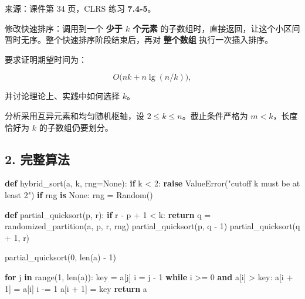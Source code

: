 \documentclass[
  UTF8,fontset=none,zihao=5]{ctexart}
\newenvironment{Shaded}{}{}
\newcommand{\BuiltInTok}[1]{#1}
\newcommand{\ControlFlowTok}[1]{\textcolor[rgb]{0.00,0.44,0.13}{\textbf{#1}}}
\newcommand{\DecValTok}[1]{\textcolor[rgb]{0.25,0.63,0.44}{#1}}
\newcommand{\KeywordTok}[1]{\textcolor[rgb]{0.00,0.44,0.13}{\textbf{#1}}}
\newcommand{\NormalTok}[1]{#1}
\newcommand{\OperatorTok}[1]{\textcolor[rgb]{0.40,0.40,0.40}{#1}}
\newcommand{\PreprocessorTok}[1]{\textcolor[rgb]{0.74,0.48,0.00}{#1}}
\newcommand{\StringTok}[1]{\textcolor[rgb]{0.25,0.44,0.63}{#1}}
\newcommand{\VariableTok}[1]{\textcolor[rgb]{0.10,0.09,0.49}{#1}}
\renewenvironment{Shaded}{\begin{snugshade}}{\end{snugshade}}
\let\OldSubsection\subsection
\renewcommand{\subsection}{\Needspace{4\baselineskip}\OldSubsection}
\begin{document}
来源：课件第 34 页，CLRS 练习 \textbf{7.4-5}。

修改快速排序：调用到一个 \textbf{少于 \(k\) 个元素}
的子数组时，直接返回，让这个小区间暂时无序。整个快速排序阶段结束后，再对
\textbf{整个数组} 执行一次插入排序。

要求证明期望时间为：

\[
\boxed{O\bigl(nk+n\lg(n/k)\bigr)},
\]

并讨论理论上、实践中如何选择 \(k\)。

分析采用互异元素和均匀随机枢轴，设 \(2\le k\le n\)。截止条件严格为
\(m<k\)，长度恰好为 \(k\) 的子数组仍要划分。

\hypertarget{ux5b8cux6574ux7b97ux6cd5}{%
\subsection{2. 完整算法}\label{ux5b8cux6574ux7b97ux6cd5}}

\Needspace{246pt}

\begin{Shaded}
\begin{Highlighting}[]
\KeywordTok{def}\NormalTok{ hybrid\_sort(a, k, rng}\OperatorTok{=}\VariableTok{None}\NormalTok{):}
    \ControlFlowTok{if}\NormalTok{ k }\OperatorTok{\textless{}} \DecValTok{2}\NormalTok{:}
        \ControlFlowTok{raise} \PreprocessorTok{ValueError}\NormalTok{(}\StringTok{"cutoff k must be at least 2"}\NormalTok{)}
    \ControlFlowTok{if}\NormalTok{ rng }\KeywordTok{is} \VariableTok{None}\NormalTok{:}
\NormalTok{        rng }\OperatorTok{=}\NormalTok{ Random()}

    \KeywordTok{def}\NormalTok{ partial\_quicksort(p, r):}
        \ControlFlowTok{if}\NormalTok{ r }\OperatorTok{{-}}\NormalTok{ p }\OperatorTok{+} \DecValTok{1} \OperatorTok{\textless{}}\NormalTok{ k:}
            \ControlFlowTok{return}
\NormalTok{        q }\OperatorTok{=}\NormalTok{ randomized\_partition(a, p, r, rng)}
\NormalTok{        partial\_quicksort(p, q }\OperatorTok{{-}} \DecValTok{1}\NormalTok{)}
\NormalTok{        partial\_quicksort(q }\OperatorTok{+} \DecValTok{1}\NormalTok{, r)}

\NormalTok{    partial\_quicksort(}\DecValTok{0}\NormalTok{, }\BuiltInTok{len}\NormalTok{(a) }\OperatorTok{{-}} \DecValTok{1}\NormalTok{)}

    \ControlFlowTok{for}\NormalTok{ j }\KeywordTok{in} \BuiltInTok{range}\NormalTok{(}\DecValTok{1}\NormalTok{, }\BuiltInTok{len}\NormalTok{(a)):}
\NormalTok{        key }\OperatorTok{=}\NormalTok{ a[j]}
\NormalTok{        i }\OperatorTok{=}\NormalTok{ j }\OperatorTok{{-}} \DecValTok{1}
        \ControlFlowTok{while}\NormalTok{ i }\OperatorTok{\textgreater{}=} \DecValTok{0} \KeywordTok{and}\NormalTok{ a[i] }\OperatorTok{\textgreater{}}\NormalTok{ key:}
\NormalTok{            a[i }\OperatorTok{+} \DecValTok{1}\NormalTok{] }\OperatorTok{=}\NormalTok{ a[i]}
\NormalTok{            i }\OperatorTok{{-}=} \DecValTok{1}
\NormalTok{        a[i }\OperatorTok{+} \DecValTok{1}\NormalTok{] }\OperatorTok{=}\NormalTok{ key}
    \ControlFlowTok{return}\NormalTok{ a}
\end{Highlighting}
\end{Shaded}
\end{document}
